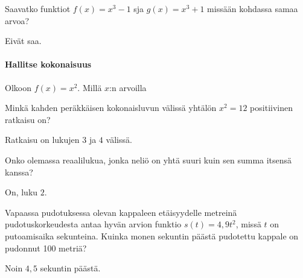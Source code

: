 \begin{tehtavasivu}
\begin{tehtava}
Saavatko funktiot $ f(x)=x^{3}-1$ sja $ g(x)=x^{3}+1$ missään kohdassa samaa arvoa?
\begin{vastaus}
Eivät saa.
\end{vastaus}
\end{tehtava}

\paragraph*{Hallitse kokonaisuus}

\begin{tehtava}
Olkoon $f(x)=x^2$. Millä $x$:n arvoilla
\begin{alakohdat}
\end{alakohdat}
\begin{vastaus}
\begin{alakohdat}
\end{alakohdat}
\end{vastaus}
\end{tehtava}

\begin{tehtava}
Minkä kahden peräkkäisen kokonaisluvun välissä yhtälön $x^2 = 12$ positiivinen ratkaisu on?
\begin{vastaus}
Ratkaisu on lukujen $3$ ja $4$ välissä.
\end{vastaus}
\end{tehtava}

\begin{tehtava}
Onko olemassa reaalilukua, jonka neliö on yhtä suuri kuin sen summa itsensä kanssa?
\begin{vastaus}
On, luku $ 2 $.
\end{vastaus}
\end{tehtava}

\begin{tehtava}
Vapaassa pudotuksessa olevan kappaleen etäisyydelle metreinä pudotuskorkeudesta antaa hyvän arvion funktio $ s(t)=4,9t^{2}$, missä $ t $ on putoamisaika sekunteina. Kuinka monen sekuntin päästä pudotettu kappale on pudonnut 100 metriä?
\begin{vastaus}
Noin $4,5$ sekuntin päästä.
\end{vastaus}
\end{tehtava}


\end{tehtavasivu}
